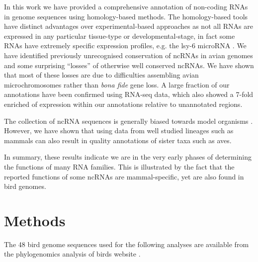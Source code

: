 \documentclass[10pt]{bmc_article}
\newenvironment{bmcformat}{\begin{raggedright}\baselineskip20pt\sloppy\setboolean{publ}{false}}{\end{raggedright}\baselineskip20pt\sloppy}
\begin{document}
\begin{bmcformat}

In this work we have provided a comprehensive annotation of non-coding
RNAs in genome sequences using homology-based methods. The
homology-based tools have distinct advantages over experimental-based
approaches as not all RNAs are expressed in any particular tissue-type
or developmental-stage, in fact some RNAs have extremely specific
expression profiles, e.g. the lsy-6 microRNA \cite{Johnston:2003}.  We
have identified previously unrecognised conservation of ncRNAs in
avian genomes and some surprising ``losses'' of otherwise well
conserved ncRNAs. We have shown that most of these losses are due to
difficulties assembling avian microchromosomes rather than \emph{bona
  fide} gene loss. A large fraction of our annotations have been
confirmed using RNA-seq data, which also showed a 7-fold enriched of
expression within our annotations relative to unannotated regions.

The collection of ncRNA sequences is generally biased towards model
organisms \cite{Gardner:2010,Hoeppner:2012}. However, we have shown
that using data from well studied lineages such as mammals can also
result in quality annotations of sister taxa such as aves.

In summary, these results indicate we are in the very early phases of
determining the functions of many RNA families. This is illustrated by
the fact that the reported functions of some ncRNAs are
mammal-specific, yet are also found in bird genomes.


\section*{Methods}

The 48 bird genome sequences used for the following analyses are available from
the phylogenomics analysis of birds website \cite{birdphylogen}.


\end{bmcformat}
\end{document}
